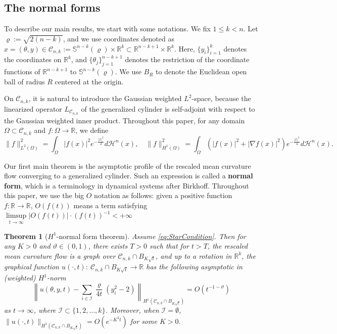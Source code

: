 \documentclass[11pt]{amsart}
\numberwithin{equation}{section}
\newtheorem{theorem}{Theorem}[section]
\numberwithin{equation}{section}
\newcommand{\cH}{\mathcal{H}}
\newcommand{\cC}{\mathcal{C}}
\newcommand{\R}{\mathbb{R}}
\begin{document}
	
	
	
	\subsection{The normal forms}
	To describe our main results, we start with some notations. We fix $1\leq k< n$. Let $\varrho:=\sqrt{2(n-k)}$, and we use coordinates denoted as $x=(\theta, y)\in \cC_{n,k}:=\mathbb{S}^{n-k}(\varrho)\times\R^k \subset \mathbb{R}^{n-k+1}\times\mathbb{R}^k$. Here, $\{y_i\}_{i=1}^k$ denotes the coordinates on $\mathbb{R}^k$, and $\{\theta_j\}_{j=1}^{n-k+1}$ denotes the restriction of the coordinate functions of $\mathbb{R}^{n-k+1}$ to $\mathbb{S}^{n-k}(\varrho)$. We use $B_R$ to denote the Euclidean open ball of radius $R$ centered at the origin.
	
	On $\cC_{n,k}$, it is natural to introduce the Gaussian weighted $L^2$-space, because the linearized operator $L_{\cC_{n,k}}$ of the generalized cylinder is self-adjoint with respect to the Gaussian weighted inner product. Throughout this paper, for any domain $\Omega\subset\cC_{n,k}$ and $f:\Omega\to\R$, we define
	\[
	\|f\|^2_{L^2(\Omega)}=\int_{\Omega}|f(x)|^2 e^{-\frac{|x|^2}{4}}d\cH^n(x),
	\quad 
	\|f\|^2_{H^1(\Omega)}=\int_{\Omega}(|f(x)|^2 +|\nabla f(x)|^2)e^{-\frac{|x|^2}{4}}d\cH^n(x).
	\]
	
	Our first main theorem is the asymptotic profile of the rescaled mean curvature flow converging to a generalized cylinder. Such an expression is called a {\bf normal form}, which is a terminology in dynamical systems after Birkhoff. Throughout this paper, we use the big $O$ notation as follows: given a positive function $f:\R\to\R$, $O(f(t))$ means a term satisfying $\limsup\limits_{t\to\infty}|O(f(t))|\cdot (f(t))^{-1}<+\infty$
	
	\begin{theorem}[$H^1$-normal form theorem]\label{ThmNF-sqrtt} Assume \eqref{eq:StarCondition}. Then  for any $K>0$ and $\vartheta\in(0,1)$, there exists $T>0$  such that for $t>T$, the rescaled mean curvature flow is a graph over $\cC_{n,k}\cap B_{K\sqrt{t}}$, and up to a rotation in $\R^k$, the graphical function $u(\cdot,t):\ \cC_{n,k}\cap B_{K\sqrt{t}}\to \R$ has the following asymptotic in (weighted) $H^1$-norm
		\begin{equation}
			\left\|u(\theta,y,t)-\sum_{i\in \mathcal I}\frac{\varrho }{4t}(y_i^2-2)\right\|_{H^1(\cC_{n,k}\cap B_{K\sqrt{t}})}=O(t^{-1-\vartheta})
		\end{equation}
		as $t\to\infty$, where $\mathcal I\subset \{1,2,\ldots,k\}$. Moreover, when $\mathcal I=\emptyset$, $\|u(\cdot,t)\|_{H^1(\cC_{n,k}\cap B_{K\sqrt{t}})}=O(e^{-K^2t})$ for some $K>0$. 
	\end{theorem}
	
\end{document}
